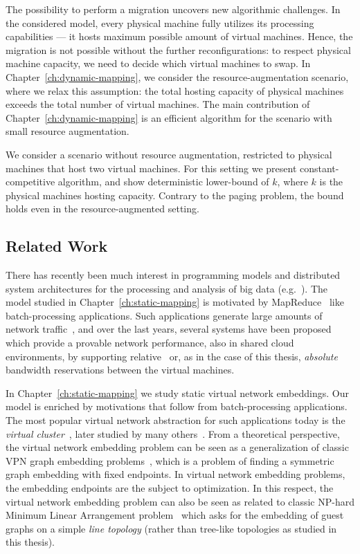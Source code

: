The possibility to perform a migration uncovers new algorithmic challenges.
In the considered model, every physical machine fully utilizes its processing capabilities --- it hosts maximum possible amount of virtual machines.
Hence, the migration is not possible without the further reconfigurations: to respect physical machine capacity, we need to decide which virtual machines to swap.
In Chapter~\ref{ch:dynamic-mapping}, we consider the resource-augmentation scenario, where we relax this assumption: the total hosting capacity of physical machines exceeds the total number of virtual machines.
The main contribution of Chapter~\ref{ch:dynamic-mapping} is an efficient algorithm for the scenario with small resource augmentation.

We consider a scenario without resource augmentation, restricted to physical machines that host two virtual machines.
For this setting we present constant-competitive algorithm, and show deterministic lower-bound of $k$, where $k$ is the physical machines hosting capacity.
Contrary to the paging problem, the bound holds even in the resource-augmented setting.

\subsection{Related Work}


There has recently been much interest in programming models and distributed
system architectures for the processing and analysis of big data (e.g.~\cite{nodb,mapreduce,shark}). The model studied in
Chapter~\ref{ch:static-mapping} is motivated by MapReduce~\cite{mapreduce} like batch-processing applications.
Such applications
generate large amounts of network traffic~\cite{orchestra,talk-about,amazonbw},
and over the last years, several systems have been proposed which provide
a provable network performance, also in shared cloud environments, by supporting
relative~\cite{faircloud,elasticswitch,seawall}
or, as in the case of this thesis, \emph{absolute}~\cite{oktopus,secondnet,drl,gatekeeper,proteus} bandwidth reservations
between the virtual machines.

In Chapter~\ref{ch:static-mapping} we study static virtual network embeddings.
Our model is enriched by motivations that follow from batch-processing applications.
The most popular virtual network abstraction for such applications today is the \emph{virtual cluster}~\cite{oktopus}, later studied by many others~\cite{talk-about,infocom16,ccr15emb,proteus}.
From a theoretical perspective, the virtual network embedding problem can be seen as a generalization
of classic VPN graph embedding problems~\cite{Goyal2008,gupta2001provisioning}, which is a problem of finding a symmetric graph embedding with fixed endpoints.
In virtual network embedding problems, the embedding endpoints are the subject to optimization.
In this respect, the virtual network embedding problem can also be seen as related to
classic NP-hard Minimum Linear Arrangement problem~\cite{mla,mla-survey} which asks for the
embedding of guest graphs on a simple \emph{line topology} (rather than tree-like topologies as
studied in this thesis).




